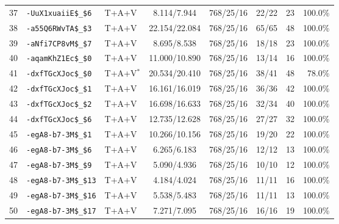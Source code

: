 \begin{table}[!ht]
\begin{tabular}{rllccrrr}
37 & \texttt{-UuX1xuaiiE\$\_\$6} & T+A+V & 8.114/7.944 & 768/25/16 & 22/22 & 23 & 100.0\% \\
38 & \texttt{-a55Q6RWvTA\$\_\$3} & T+A+V & 22.154/22.084 & 768/25/16 & 65/65 & 48 & 100.0\% \\
39 & \texttt{-aNfi7CP8vM\$\_\$7} & T+A+V & 8.695/8.538 & 768/25/16 & 18/18 & 23 & 100.0\% \\
40 & \texttt{-aqamKhZ1Ec\$\_\$0} & T+A+V & 11.000/10.890 & 768/25/16 & 13/14 & 16 & 100.0\% \\
41 & \texttt{-dxfTGcXJoc\$\_\$0} & T+A+V$^{*}$ & 20.534/20.410 & 768/25/16 & 38/41 & 48 & 78.0\% \\
42 & \texttt{-dxfTGcXJoc\$\_\$1} & T+A+V & 16.161/16.019 & 768/25/16 & 36/36 & 42 & 100.0\% \\
43 & \texttt{-dxfTGcXJoc\$\_\$2} & T+A+V & 16.698/16.633 & 768/25/16 & 32/34 & 40 & 100.0\% \\
44 & \texttt{-dxfTGcXJoc\$\_\$6} & T+A+V & 12.735/12.628 & 768/25/16 & 27/27 & 32 & 100.0\% \\
45 & \texttt{-egA8-b7-3M\$\_\$1} & T+A+V & 10.266/10.156 & 768/25/16 & 19/20 & 22 & 100.0\% \\
46 & \texttt{-egA8-b7-3M\$\_\$6} & T+A+V & 6.265/6.183 & 768/25/16 & 12/12 & 13 & 100.0\% \\
47 & \texttt{-egA8-b7-3M\$\_\$9} & T+A+V & 5.090/4.936 & 768/25/16 & 10/10 & 12 & 100.0\% \\
48 & \texttt{-egA8-b7-3M\$\_\$13} & T+A+V & 4.184/4.024 & 768/25/16 & 11/11 & 16 & 100.0\% \\
49 & \texttt{-egA8-b7-3M\$\_\$16} & T+A+V & 5.538/5.483 & 768/25/16 & 11/11 & 13 & 100.0\% \\
50 & \texttt{-egA8-b7-3M\$\_\$17} & T+A+V & 7.271/7.095 & 768/25/16 & 16/16 & 19 & 100.0\% \\
\bottomrule
\end{tabular}
\end{table}
\clearpage
